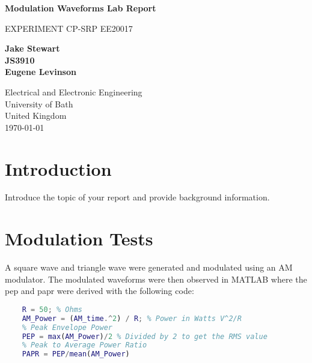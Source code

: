 \documentclass[a4paper]{article}
\begin{document}
\begin{titlepage}
    \begin{center}
        \vspace*{1cm}

        \Huge
        \textbf{Modulation Waveforms Lab Report}

        \vspace{0.5cm}
        \LARGE
        EXPERIMENT CP-SRP
        EE20017
        
        \vspace{1.5cm}

        \textbf{Jake Stewart}\\
        \textbf{JS3910}\\

        \textbf{Eugene Levinson}\\
        \vspace{0.8cm}

        
        \Large
        Electrical and Electronic Engineering\\
        University of Bath\\
        United Kingdom\\
        \today

    \end{center}
\end{titlepage}

\newpage
\tableofcontents
\newpage

\section{Introduction}
Introduce the topic of your report and provide background information.

\section{Modulation Tests}
A square wave and triangle wave were generated and modulated using an AM modulator.
The modulated waveforms were then observed in MATLAB where the \gls{pep} and \gls{papr} were derived with the following code:

\begin{lstlisting}[language=Matlab]
    % AM Power
    R = 50; % Ohms
    AM_Power = (AM_time.^2) / R; % Power in Watts V^2/R
    % Peak Envelope Power
    PEP = max(AM_Power)/2 % Divided by 2 to get the RMS value
    % Peak to Average Power Ratio
    PAPR = PEP/mean(AM_Power)
\end{lstlisting}
\end{document}
